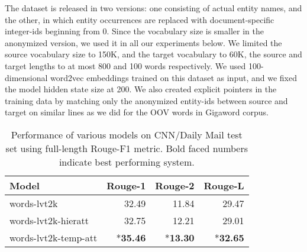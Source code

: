 \documentclass[11pt]{article}
\begin{document}
The dataset is released in two versions: one consisting of actual entity names, and the other, in which entity occurrences are replaced with document-specific integer-ids beginning from 0. Since the vocabulary size is smaller in the anonymized version, we used it in all our experiments below. We limited the source vocabulary size to 150K, and the target vocabulary to 60K, the source and target lengths to at most 800 and 100 words respectively. We used 100-dimensional word2vec embeddings trained on this dataset as input, and we fixed the model hidden state size at 200. We also created explicit pointers in the training data by matching only the anonymized entity-ids between source and target on similar lines as we did for the OOV words in Gigaword corpus. 

\begin{table}[]
\centering
{\small
\begin{tabular}{|l|r|r|r|}
\hline
Model & Rouge-1 & Rouge-2 & Rouge-L \\
\hline
words-lvt2k & 32.49 & 11.84 & 29.47 \\
words-lvt2k-hieratt & 32.75 & 12.21 & 29.01 \\
words-lvt2k-temp-att & *{\bf 35.46} & *{\bf 13.30} & *{\bf 32.65} \\
\hline
\end{tabular}
}
\caption{{\small Performance of various models on CNN/Daily Mail test set using full-length Rouge-F1 metric. Bold faced numbers indicate best performing system.}}
\label{tab:cnn}
\vspace{-0.2in}
\end{table}
\end{document}
